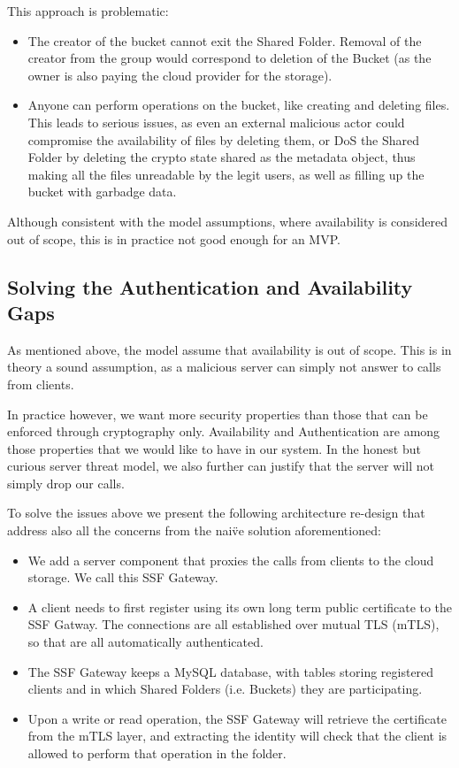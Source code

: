 This approach is problematic:
\begin{itemize}
    \item The creator of the bucket cannot exit the Shared Folder. Removal of the creator from the group would correspond to deletion of the Bucket (as the owner is also paying the cloud provider for the storage).
    \item Anyone can perform operations on the bucket, like creating and deleting files. This leads to serious issues, as even an external malicious actor could compromise the availability of files by deleting them, or DoS the Shared Folder by deleting the crypto state shared as the metadata object, thus making all the files unreadable by the legit users, as well as filling up the bucket with garbadge data.
\end{itemize}

Although consistent with the model assumptions, where availability is considered out of scope, this is in practice not good enough for an MVP.

\subsection{Solving the Authentication and Availability Gaps}\label{subsc:solving-the-authentaction-and-availability-gap}

As mentioned above, the model assume that availability is out of scope. 
This is in theory a sound assumption, as a malicious server can simply not answer to calls from clients.

In practice however, we want more security properties than those that can be enforced through cryptography only.
Availability and Authentication are among those properties that we would like to have in our system.
In the honest but curious server threat model, we also further can justify that the server will not simply drop our calls.

To solve the issues above we present the following architecture re-design that address also all the concerns from the nai\"ve solution aforementioned:
\begin{itemize}
    \item We add a server component that proxies the calls from clients to the cloud storage. We call this SSF Gateway.
    \item A client needs to first register using its own long term public certificate to the SSF Gatway. The connections are all established over mutual TLS (mTLS), so that are all automatically authenticated.
    \item The SSF Gateway keeps a MySQL database, with tables storing registered clients and in which Shared Folders (i.e. Buckets) they are participating.
    \item Upon a write or read operation, the SSF Gateway will retrieve the certificate from the mTLS layer, and extracting the identity will check that the client is allowed to perform that operation in the folder.
\end{itemize}


